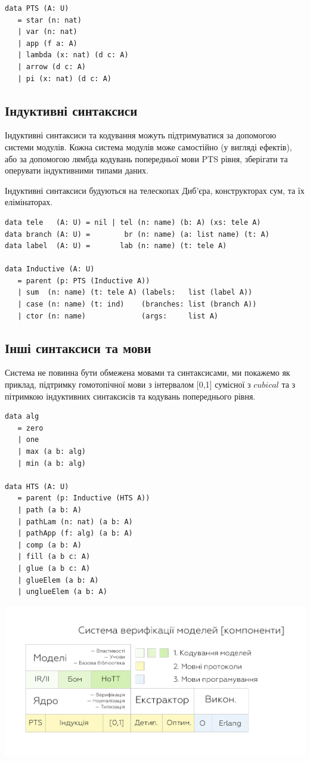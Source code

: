 \begin{lstlisting}[mathescape=true]
data PTS (A: U)
   = star (n: nat)
   | var (n: nat)
   | app (f a: A)
   | lambda (x: nat) (d c: A)
   | arrow (d c: A)
   | pi (x: nat) (d c: A)
\end{lstlisting}

\subsection{Індуктивні синтаксиси}
Індуктивні синтаксиси та кодування можуть підтримуватися за допомогою системи модулів.
Кожна система модулів може самостійно (у вигляді ефектів), або за допомогою лямбда кодувань
попередньої мови PTS рівня, зберігати та оперувати індуктивними типами даних.

Індуктивні синтаксиси будуються на телескопах Диб'єра,
конструкторах сум, та їх елімінаторах.

\begin{lstlisting}[mathescape=true]
data tele   (A: U) = nil | tel (n: name) (b: A) (xs: tele A)
data branch (A: U) =        br (n: name) (a: list name) (t: A)
data label  (A: U) =       lab (n: name) (t: tele A)

data Inductive (A: U)
   = parent (p: PTS (Inductive A))
   | sum  (n: name) (t: tele A) (labels:   list (label A))
   | case (n: name) (t: ind)    (branches: list (branch A))
   | ctor (n: name)             (args:     list A)
\end{lstlisting}

\subsection{Інші синтаксиси та мови}
Система не повинна бути обмежена мовами та синтаксисами, ми покажемо як приклад,
підтримку гомотопічної мови з інтервалом [0,1] сумісної з $cubical$ та з пітримкою індуктивних
синтаксисів та кодувань попереднього рівня.

\begin{lstlisting}[mathescape=true]
data alg
   = zero
   | one
   | max (a b: alg)
   | min (a b: alg)

data HTS (A: U)
   = parent (p: Inductive (HTS A))
   | path (a b: A)
   | pathLam (n: nat) (a b: A)
   | pathApp (f: alg) (a b: A)
   | comp (a b: A)
   | fill (a b c: A)
   | glue (a b c: A)
   | glueElem (a b: A)
   | unglueElem (a b: A)
\end{lstlisting}

\includegraphics[scale=0.18]{static}

